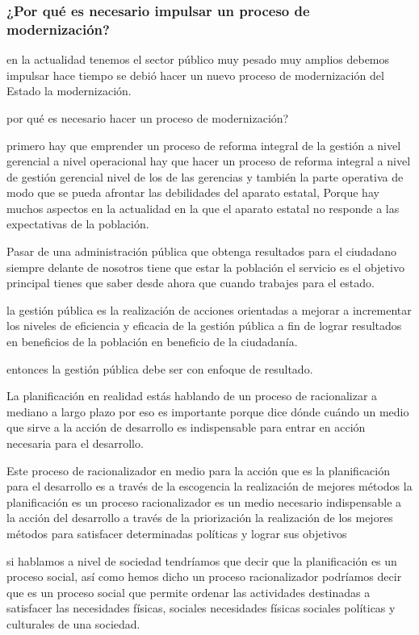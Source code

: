 \documentclass[
  a4paper,
]{article}
\begin{document}
\subsubsection{¿Por qué es necesario impulsar un proceso de
modernización?}\label{por-quuxe9-es-necesario-impulsar-un-proceso-de-modernizaciuxf3n}

en la actualidad tenemos el sector público muy pesado muy amplios
debemos impulsar hace tiempo se debió hacer un nuevo proceso de
modernización del Estado la modernización.

por qué es necesario hacer un proceso de modernización?

primero hay que emprender un proceso de reforma integral de la gestión a
nivel gerencial a nivel operacional hay que hacer un proceso de reforma
integral a nivel de gestión gerencial nivel de los de las gerencias y
también la parte operativa de modo que se pueda afrontar las debilidades
del aparato estatal, Porque hay muchos aspectos en la actualidad en la
que el aparato estatal no responde a las expectativas de la población.

Pasar de una administración pública que obtenga resultados para el
ciudadano siempre delante de nosotros tiene que estar la población el
servicio es el objetivo principal tienes que saber desde ahora que
cuando trabajes para el estado.

la gestión pública es la realización de acciones orientadas a mejorar a
incrementar los niveles de eficiencia y eficacia de la gestión pública a
fin de lograr resultados en beneficios de la población en beneficio de
la ciudadanía.

entonces la gestión pública debe ser con enfoque de resultado.

La planificación en realidad estás hablando de un proceso de
racionalizar a mediano a largo plazo por eso es importante porque dice
dónde cuándo un medio que sirve a la acción de desarrollo es
indispensable para entrar en acción necesaria para el desarrollo.

Este proceso de racionalizador en medio para la acción que es la
planificación para el desarrollo es a través de la escogencia la
realización de mejores métodos la planificación es un proceso
racionalizador es un medio necesario indispensable a la acción del
desarrollo a través de la priorización la realización de los mejores
métodos para satisfacer determinadas políticas y lograr sus objetivos

si hablamos a nivel de sociedad tendríamos que decir que la
planificación es un proceso social, así como hemos dicho un proceso
racionalizador podríamos decir que es un proceso social que permite
ordenar las actividades destinadas a satisfacer las necesidades físicas,
sociales necesidades físicas sociales políticas y culturales de una
sociedad.
\end{document}
